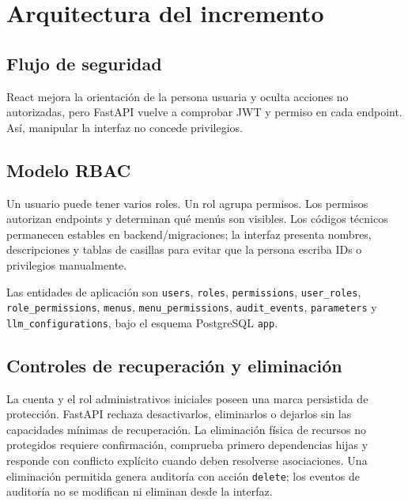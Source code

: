 \documentclass[11pt,letterpaper]{article}
\newcommand{\file}[1]{\texttt{#1}}
\begin{document}
\section{Arquitectura del incremento}

\subsection{Flujo de seguridad}

\begin{center}
\end{center}

React mejora la orientación de la persona usuaria y oculta acciones no autorizadas, pero FastAPI vuelve a comprobar JWT y permiso en cada endpoint. Así, manipular la interfaz no concede privilegios.

\subsection{Modelo RBAC}

Un usuario puede tener varios roles. Un rol agrupa permisos. Los permisos autorizan endpoints y determinan qué menús son visibles. Los códigos técnicos permanecen estables en backend/migraciones; la interfaz presenta nombres, descripciones y tablas de casillas para evitar que la persona escriba IDs o privilegios manualmente.

Las entidades de aplicación son \file{users}, \file{roles}, \file{permissions}, \file{user\_roles}, \file{role\_permissions}, \file{menus}, \file{menu\_permissions}, \file{audit\_events}, \file{parameters} y \file{llm\_configurations}, bajo el esquema PostgreSQL \file{app}.

\subsection{Controles de recuperación y eliminación}

La cuenta y el rol administrativos iniciales poseen una marca persistida de protección. FastAPI rechaza desactivarlos, eliminarlos o dejarlos sin las capacidades mínimas de recuperación. La eliminación física de recursos no protegidos requiere confirmación, comprueba primero dependencias hijas y responde con conflicto explícito cuando deben resolverse asociaciones. Una eliminación permitida genera auditoría con acción \file{delete}; los eventos de auditoría no se modifican ni eliminan desde la interfaz.
\end{document}
